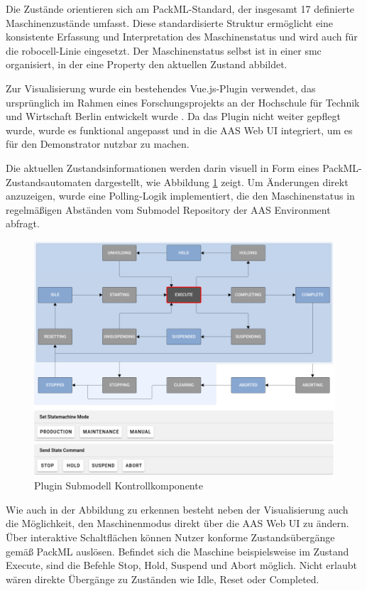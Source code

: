 Die Zustände orientieren sich am PackML-Standard, der insgesamt 17 definierte Maschinenzustände umfasst. 
Diese standardisierte Struktur ermöglicht eine konsistente Erfassung und Interpretation des Maschinenstatus und wird auch für die robocell-Linie eingesetzt.
Der Maschinenstatus selbst ist in einer \acs{smc} organisiert, in der eine Property den aktuellen Zustand abbildet.

Zur Visualisierung wurde ein bestehendes Vue.js-Plugin verwendet, das ursprünglich im Rahmen eines Forschungsprojekts an der Hochschule für Technik und Wirtschaft Berlin entwickelt wurde \cite{HTW1}\cite{HTW2}. 
Da das Plugin nicht weiter gepflegt wurde, wurde es funktional angepasst und in die AAS Web UI integriert, um es für den Demonstrator nutzbar zu machen.

Die aktuellen Zustandsinformationen werden darin visuell in Form eines PackML-Zu\-standsautomaten dargestellt, wie Abbildung \ref{fig:PackMLZustandsautomat} zeigt. 
Um Änderungen direkt anzuzeigen, wurde eine Polling-Logik implementiert, die den Maschinenstatus in regelmäßigen Abständen vom Submodel Repository der AAS Environment abfragt.

\begin{figure}[htbp] 
    \centering 
        \includegraphics[width=1\textwidth]{Bilder/Ergebnisse/DynamischeDaten/Kontrollkomponente/PackMl.PNG} 
    \caption{Plugin Submodell Kontrollkomponente} 
    \label{fig:PackMLZustandsautomat} 
\end{figure}

Wie auch in der Abbildung zu erkennen besteht neben der Visualisierung auch die Möglichkeit, den Maschinenmodus direkt über die AAS Web UI zu ändern. 
Über interaktive Schaltflächen können Nutzer konforme Zustandsübergänge gemäß PackML auslösen. 
Befindet sich die Maschine beispielsweise im Zustand Execute, sind die Befehle Stop, Hold, Suspend und Abort möglich. 
Nicht erlaubt wären direkte Übergänge zu Zuständen wie Idle, Reset oder Completed.

